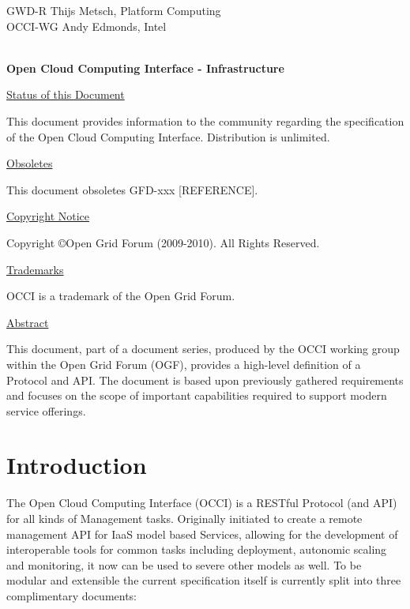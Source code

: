 \documentclass[10pt,a4paper]{article}
\begin{document}
\thispagestyle{empty}

GWD-R \hfill  Thijs Metsch, Platform Computing\\
OCCI-WG \hfill  Andy Edmonds, Intel\\
\\

\vspace*{0.5in}

\begin{Large}
\textbf{Open Cloud Computing Interface - Infrastructure}
\end{Large}

\vspace*{0.5in}

\underline{Status of this Document}

This document provides information to the community regarding the specification of the Open Cloud Computing Interface. Distribution is unlimited.

\underline{Obsoletes}

This document obsoletes GFD-xxx [REFERENCE].

\underline{Copyright Notice}

Copyright \copyright Open Grid Forum (2009-2010). All Rights Reserved.

\underline{Trademarks}

OCCI is a trademark of the Open Grid Forum.

\underline{Abstract}

This document, part of a document series, produced by the OCCI working group within the Open Grid Forum (OGF), provides a high-level definition of a Protocol and API. The document is based upon previously gathered requirements and focuses on the scope of important capabilities required to support modern service offerings. 

\newpage
\tableofcontents
\newpage

\section{Introduction}

The Open Cloud Computing Interface (OCCI) is a RESTful Protocol (and API) for all kinds of Management tasks. Originally initiated to create a remote management API for IaaS model based Services, allowing for the development of interoperable tools for common tasks including deployment, autonomic scaling and monitoring, it now can be used to severe other models as well. To be modular and extensible the current specification itself is currently split into three complimentary documents:
\end{document}
